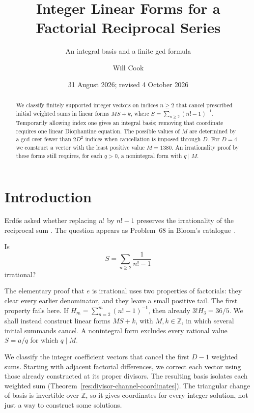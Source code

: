 \documentclass[11pt]{article}
\title{Integer Linear Forms for a\\Factorial Reciprocal Series}
\subtitle{An integral basis and a finite gcd formula}
\author{Will Cook}
\date{31 August 2026; revised 4 October 2026}
\newcommand{\Ser}{S}
\begin{document}
\maketitle
\noteprovenance

\begin{abstract}
We classify finitely supported integer vectors on indices $n\ge2$ that
cancel prescribed initial weighted sums in linear forms $MS+k$, where
$S=\sum_{n\ge2}(n!-1)^{-1}$.
Temporarily allowing index one gives an integral basis; removing that
coordinate requires one linear Diophantine equation. The possible values of $M$ are determined by a gcd
over fewer than $2D^2$ indices when cancellation is imposed through $D$.
For $D=4$ we construct a vector with the least positive value $M=1380$.
An irrationality proof by these forms still requires, for each $q>0$,
a nonintegral form with $q\mid M$.
\end{abstract}

\section{Introduction}\label{sec:problem}

Erd\H{o}s asked whether replacing $n!$ by $n!-1$ preserves the irrationality
of the reciprocal sum \cite[p.~102]{erdos1988}. The question appears as
Problem~68 in Bloom's catalogue \cite{bloom}.

\begin{problem}\label{res:problem}
Is
\[
  \Ser=\sum_{n\ge2}\frac1{n!-1}
\]
irrational?
\end{problem}

The elementary proof that $e$ is irrational uses two properties of
factorials: they clear every earlier denominator, and they leave a small
positive tail. The first property fails here. If
$H_m=\sum_{n=2}^m(n!-1)^{-1}$, then already $3!H_3=36/5$.
We shall instead construct linear forms $MS+k$, with $M,k\in\mathbb Z$,
in which several initial summands cancel. A nonintegral form excludes
every rational value $S=a/q$ for which $q\mid M$.

We classify the integer coefficient vectors that cancel the first
$D-1$ weighted sums. Starting with adjacent factorial differences, we
correct each vector using those already constructed at its proper
divisors. The resulting basis isolates each weighted sum
(Theorem~\ref{res:divisor-channel-coordinates}). The triangular change
of basis is invertible over $\mathbb Z$, so it gives coordinates for
every integer solution, not just a way to construct some solutions.
\end{document}
